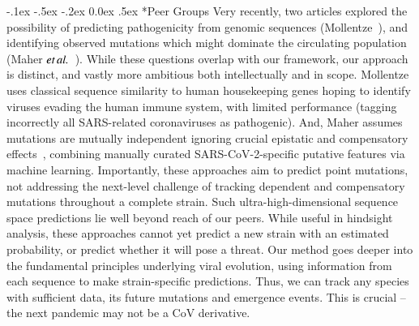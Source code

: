 \documentclass[onecolumn, compsoc,12pt]{IEEEtran}
\makeatletter
\renewcommand\paragraph{\@startsection {section}{1}{\z@}%
                                   {-.1ex \@plus -.5ex \@minus -.2ex}%
                                   {0.0ex \@plus.5ex}%
                                   {\fontsize{11}{10}\selectfont\bfseries\itshape\sffamily\color{black}}}
\def\hcov{SARS-CoV-2\xspace}
\makeatother
\begin{document}
\paragraph*{Peer Groups} %
Very recently, two articles explored the possibility of predicting pathogenicity  from genomic sequences (Mollentze~\cite{mollentze2021identifying}), and identifying observed mutations which might dominate the circulating population (Maher $\textit{et} \mspace{3mu} \textit{al.}$~\cite{maher2021predicting}). While these questions overlap with our framework,  our approach is distinct, and vastly more ambitious both intellectually and in scope. Mollentze  uses  classical  sequence similarity to  human housekeeping genes hoping to identify viruses  evading the human immune system, with limited   performance (tagging incorrectly all SARS-related coronaviruses as pathogenic). And, Maher assumes mutations are mutually independent ignoring crucial epistatic and compensatory effects~\cite{storz2018compensatory,domingo2019causes,zhou2020minimum}, combining  manually curated \hcov-specific putative features via machine learning. Importantly, these approaches  %
 aim to predict point mutations, not addressing the next-level challenge of tracking dependent and compensatory mutations throughout a complete strain. Such ultra-high-dimensional sequence space predictions  lie well beyond reach of our peers. While useful in hindsight analysis, these approaches cannot yet predict a new strain with an estimated probability, or predict whether it will pose a threat.  Our method goes deeper into the fundamental principles underlying viral evolution, using information from each sequence to make strain-specific predictions. Thus, we can track any species with sufficient data,  its future mutations and emergence events. This is crucial -- the next pandemic may not be a CoV derivative.


\end{document}
